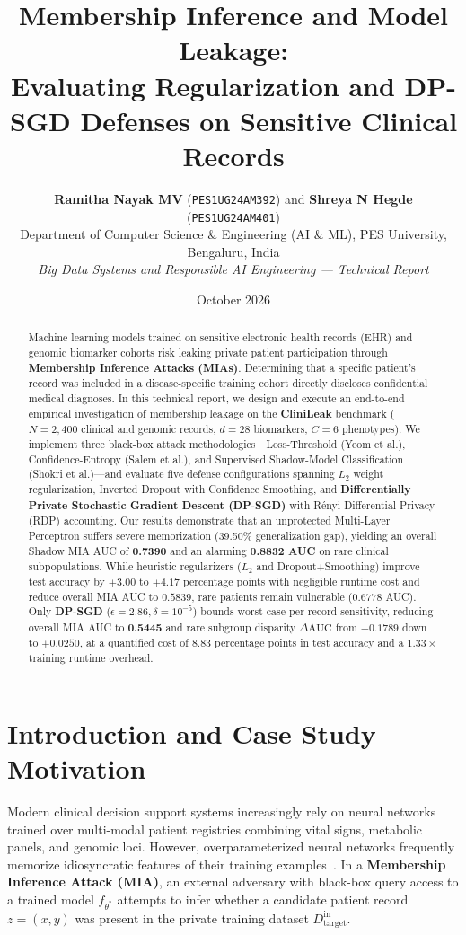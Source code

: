 \documentclass[10pt,twocolumn]{article}
\title{\vspace{-1.2em}\textbf{\Large Membership Inference and Model Leakage:\\Evaluating Regularization and DP-SGD Defenses on Sensitive Clinical Records}\vspace{-0.3em}}
\author{
    \textbf{Ramitha Nayak MV} (\texttt{PES1UG24AM392}) \quad and \quad \textbf{Shreya N Hegde} (\texttt{PES1UG24AM401})\\[0.3em]
    \small Department of Computer Science \& Engineering (AI \& ML), PES University, Bengaluru, India\\
    \small \textit{Big Data Systems and Responsible AI Engineering --- Technical Report}
}
\date{\vspace{-1.0em}\small October 2026\vspace{-0.8em}}
\begin{document}
\maketitle

\begin{abstract}
\noindent Machine learning models trained on sensitive electronic health records (EHR) and genomic biomarker cohorts risk leaking private patient participation through \textbf{Membership Inference Attacks (MIAs)}. Determining that a specific patient's record was included in a disease-specific training cohort directly discloses confidential medical diagnoses. In this technical report, we design and execute an end-to-end empirical investigation of membership leakage on the \textbf{CliniLeak} benchmark ($N=2,400$ clinical and genomic records, $d=28$ biomarkers, $C=6$ phenotypes). We implement three black-box attack methodologies---Loss-Threshold (Yeom et al.), Confidence-Entropy (Salem et al.), and Supervised Shadow-Model Classification (Shokri et al.)---and evaluate five defense configurations spanning $L_2$ weight regularization, Inverted Dropout with Confidence Smoothing, and \textbf{Differentially Private Stochastic Gradient Descent (DP-SGD)} with R\'enyi Differential Privacy (RDP) accounting. Our results demonstrate that an unprotected Multi-Layer Perceptron suffers severe memorization (39.50\% generalization gap), yielding an overall Shadow MIA AUC of \textbf{0.7390} and an alarming \textbf{0.8832 AUC} on rare clinical subpopulations. While heuristic regularizers ($L_2$ and Dropout+Smoothing) improve test accuracy by $+3.00$ to $+4.17$ percentage points with negligible runtime cost and reduce overall MIA AUC to $0.5839$, rare patients remain vulnerable ($0.6778$ AUC). Only \textbf{DP-SGD} ($\epsilon=2.86, \delta=10^{-5}$) bounds worst-case per-record sensitivity, reducing overall MIA AUC to \textbf{0.5445} and rare subgroup disparity $\Delta\text{AUC}$ from $+0.1789$ down to $+0.0250$, at a quantified cost of $8.83$ percentage points in test accuracy and a $1.33\times$ training runtime overhead.
\end{abstract}

\section{Introduction and Case Study Motivation}
Modern clinical decision support systems increasingly rely on neural networks trained over multi-modal patient registries combining vital signs, metabolic panels, and genomic loci. However, overparameterized neural networks frequently memorize idiosyncratic features of their training examples~\cite{shokri2017membership,carlini2022membership}. In a \textbf{Membership Inference Attack (MIA)}, an external adversary with black-box query access to a trained model $f_{\theta^*}$ attempts to infer whether a candidate patient record $z = (x, y)$ was present in the private training dataset $D_{\text{target}}^{\text{in}}$.
\end{document}
